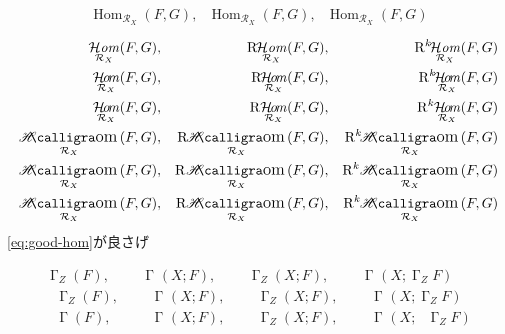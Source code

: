 \documentclass{article}
\DeclareMathOperator{\Hom}{\mathrm{Hom}} %
\newcommand{\Rder}[1][]{\mathop{\mathrm{R}^{#1}\!}\nolimits}
\newcommand{\RHom}[1][]{\Rder[#1]\!\Hom}
\DeclareMathOperator{\HOMZ}{\mathcal{H}\!\mathit{o\!m}} %
\newcommand{\RHOMZ}[1][]{\Rder[#1]\!\HOMZ}
\DeclareMathOperator{\glsec}{\Gamma}
\newcommand{\RG}[1][]{\Rder[#1]\glsec}
\newcommand{\G}[1][]{\glsec_{#1}}
\DeclareMathOperator{\HOMB}{\mathcal{H}\mathit{om}} %
\newcommand{\RHOMB}[1][]{\Rder[#1]\!\HOMB}
\DeclareMathOperator{\HOMA}{%
    \mathscr{H}\!\!\text{\!{\calligra\large om}}\,%
}
\newcommand{\RHOMA}[1][]{\Rder[#1]\!\HOMA}
\DeclareMathOperator{\HOMC}{%
    \mathscr{H}\!\!\text{\!{\calligra\large om}}\,%
}
\newcommand{\RHOMC}[1][]{\Rder[#1]\HOMC}
\DeclareMathOperator{\HOM}{\mathcal{H}\!\mathit{o\!m}}
\newcommand{\RHOM}[1][]{\Rder[#1]\mkern-1mu\HOM}
\DeclareMathOperator{\HOME}{%
    \mathscr{H}\!\!\text{\!{\calligra\large om}}\,%
}
\newcommand{\RHOME}[1][]{\Rder[#1]\mkern-1.25mu\HOME}
\newcommand{\sheaf}[1]{\mathcal{#1}}
\newcommand{\structuresheaf}[1]{\sheaf{R}_{#1}}
\begin{document}
\[
    \Hom_{\structuresheaf{X}}(F,G), \RHom[]_{\structuresheaf{X}}(F,G), \RHom[j]_{\structuresheaf{X}}(F,G)
\]

\begin{align}
    \HOMB_{\structuresheaf{X}}(F,G),&& \RHOMB[]_{\structuresheaf{X}}(F,G),&& \RHOMB[k]_{\structuresheaf{X}}(F,G)\\
    \HOMZ_{\structuresheaf{X}}(F,G),&& \RHOMZ[]_{\structuresheaf{X}}(F,G),&&\RHOMZ[k]_{\structuresheaf{X}}(F,G)\\
    \HOM_{\structuresheaf{X}}(F,G),&& \RHOM[]_{\structuresheaf{X}}(F,G),&& \RHOM[k]_{\structuresheaf{X}}(F,G)\label{eq:good-hom}\\
    \HOMA_{\structuresheaf{X}}(F,G),&& \RHOMA[]_{\structuresheaf{X}}(F,G),&& \RHOMA[k]_{\structuresheaf{X}}(F,G)\\
    \HOMC_{\structuresheaf{X}}(F,G),&& \RHOMC[]_{\structuresheaf{X}}(F,G),&& \RHOMC[k]_{\structuresheaf{X}}(F,G)\\
    \HOME_{\structuresheaf{X}}(F,G),&& \RHOME[]_{\structuresheaf{X}}(F,G),&& \RHOME[k]_{\structuresheaf{X}}(F,G)
\end{align}
\eqref{eq:good-hom}が良さげ

\begin{align}
    \G[Z](F),&&\G[](X;F),&&\G[Z](X;F),&&\G[](X;\G[Z]F)\\
    \Rder[n]\G[Z](F),&&\Rder[n]\G[](X;F),&&\Rder[n]\G[Z](X;F),&&\Rder[n]\G[](X;\G[Z]F)\\
    \RG[](F),&&\Rder[n]\G[](X;F),&&\Rder[n]\G[Z](X;F),&&\Rder[n]\G[](X;\Rder[]\G[Z]F)
\end{align}
\end{document}
